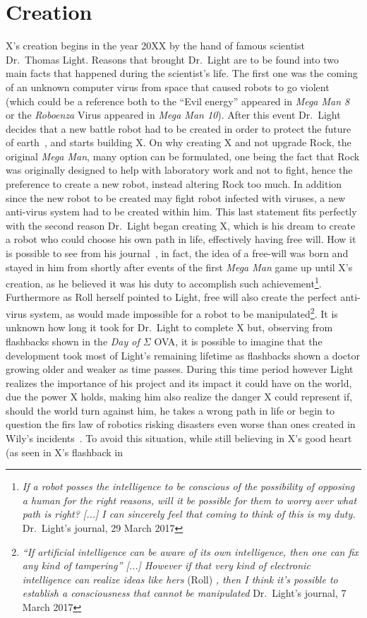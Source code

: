 \section{Creation}
X's creation begins in the year 20XX by the hand of famous scientist Dr.~Thomas Light. Reasons that brought Dr.~Light are to be found into two main facts that happened during the scientist's life. The first one was the coming of an unknown computer virus from space that caused robots to go violent (which could be a reference both to the ``Evil energy'' appeared in \emph{Mega Man 8} or the \textit{Roboenza} Virus appeared in \emph{Mega Man 10}). After this event Dr.~Light decides that a new battle robot had to be created in order to protect the future of earth~\cite{mega_man_network:Zero_timeline}, and starts building X. On why creating X and not upgrade Rock, the original \textit{Mega Man}, many option can be formulated, one being the fact that Rock was originally designed to help with laboratory work and not to fight, hence the preference to create a new robot, instead altering Rock too much. In addition since the new robot to be created may fight robot infected with viruses, a new anti-virus system had to be created within him. This last statement fits perfectly with the second reason Dr.~Light began creating X, which is his dream to create a robot who could choose his own path in life, effectively having free will. How it is possible to see from his journal~\cite{Dr.Light_journal}, in fact, the idea of a free-will was born and stayed in him from shortly after events of the first \textit{Mega Man} game up until X's creation, as he believed it was his duty to accomplish such achievement\footnote{\textit{If a robot posses the intelligence to be conscious of the possibility of opposing a human for the right reasons, will it be possible for them to worry aver what path is right? [...] I can sincerely feel that coming to think of this is my duty.} Dr.~Light's journal, 29 March 2017}. Furthermore as Roll herself pointed to Light, free will also create the perfect anti-virus system, as would made impossible for a robot to be manipulated\footnote{\textit{``If artificial intelligence can be aware of its own intelligence, then one can fix any kind of tampering'' [...] However if that very kind of electronic intelligence can realize ideas like hers} (Roll) \textit{, then I think it's possible to establish a consciousness that cannot be manipulated} Dr.~Light's journal, 7 March 2017}.  It is unknown how long it took for Dr.~Light to complete X but, observing from flashbacks shown in the \emph{Day of $\Sigma$} OVA, it is possible to imagine that the development took most of Light's remaining lifetime as flashbacks shown a doctor growing older and weaker as time passes.  During this time period however Light realizes the importance of his project and its impact it could have on the world, due the power X holds, making him also realize the danger X could represent if, should the world turn against him, he takes a wrong path in life or begin to question the firs law of robotics risking disasters even worse than ones created in Wily's incidents~\cite{elysium_light_warning}. To avoid this situation, while still believing in X's good heart (as seen in X's flashback in 